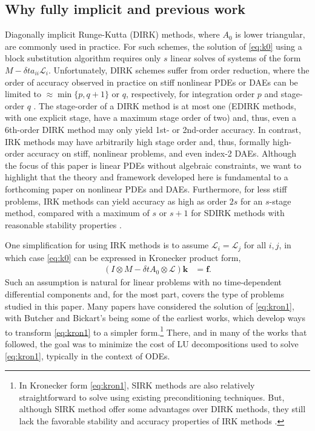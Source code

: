 \documentclass[review]{siamart}
\begin{document}
\subsection{Why fully implicit and previous work}\label{sec:intro:hist}

Diagonally implicit Runge-Kutta (DIRK) methods, where $A_0$ is lower triangular,
are commonly used in practice.
For such schemes, the solution of \eqref{eq:k0} using a block substitution algorithm
requires only $s$ linear
solves of systems of the form $ M - \delta ta_{ii}\mathcal{L}_i$. Unfortunately, DIRK
schemes suffer from order reduction, where the order of accuracy observed in practice
on stiff nonlinear PDEs or DAEs can be limited to $\approx \min\{ p, q+1\}$ or $q$,
respectively, for integration order $p$ and stage-order $q$ \cite{hairer96,kennedy16}.
The stage-order of a DIRK method is at most one (EDIRK methods, with one explicit stage,
have a maximum stage order of two) \cite{butcher00} and, thus, even a
6th-order DIRK method may only yield 1st- or 2nd-order accuracy. In contrast, IRK
methods may have arbitrarily high stage order and, thus, formally high-order accuracy on stiff,
nonlinear problems, and even index-2 DAEs. Although the focus of this paper is
linear PDEs without algebraic constraints, we want to highlight that the theory
and framework developed here is fundamental to a forthcoming paper on
nonlinear PDEs and DAEs. Furthermore, for less stiff
problems, IRK methods can yield accuracy as high as order $2s$ for an $s$-stage method,
compared with a maximum of $s$ or $s+1$ for SDIRK methods with reasonable stability
properties \cite[Section IV.6]{hairer96}.

One simplification for using IRK methods is to assume $\mathcal{L}_i =
\mathcal{L}_j$ for all $i,j$, in which case \eqref{eq:k0} can be expressed in
Kronecker product form,
%
\begin{align}\label{eq:kron1}
(I\otimes M - \delta t A_0\otimes \mathcal{L})\mathbf{k} & = \mathbf{f}.
\end{align}
%
Such an assumption is natural for linear problems with no time-dependent differential
components and, for the most part, covers the type of problems studied in this paper.
Many papers have considered the solution of \eqref{eq:kron1}, with Butcher
\cite{butcher76} and Bickart's \cite{bickart77} being some of the earliest works,
which develop ways to transform \eqref{eq:kron1} to a simpler form.\footnote{In Kronecker form \eqref{eq:kron1}, SIRK methods \cite{norsett1976runge} are also
relatively straightforward to solve using existing preconditioning techniques.
But, although SIRK method offer some advantages over DIRK methods, they still lack
the favorable stability and accuracy properties of IRK methods \cite{burrage82,orel91}.}
There, and in many of the works that followed, the goal was to minimize the cost of LU
decompositions used to solve \eqref{eq:kron1}, typically in the context of ODEs.
\end{document}
